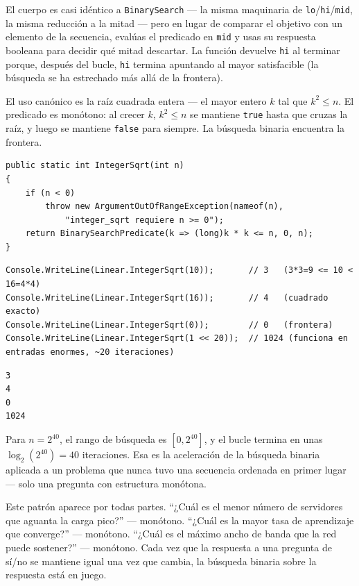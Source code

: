 \documentclass[11pt,a4paper]{article}
\begin{document}
El cuerpo es casi idéntico a \texttt{BinarySearch} --- la misma maquinaria de \texttt{lo}/\texttt{hi}/\texttt{mid}, la misma reducción a la mitad --- pero en lugar de comparar el objetivo con un elemento de la secuencia, evalúas el predicado en \texttt{mid} y usas su respuesta booleana para decidir qué mitad descartar. La función devuelve \texttt{hi} al terminar porque, después del bucle, \texttt{hi} termina apuntando al mayor satisfacible (la búsqueda se ha estrechado más allá de la frontera).

El uso canónico es la raíz cuadrada entera --- el mayor entero $k$ tal que $k^2 \le n$. El predicado es monótono: al crecer $k$, $k^2 \le n$ se mantiene \texttt{true} hasta que cruzas la raíz, y luego se mantiene \texttt{false} para siempre. La búsqueda binaria encuentra la frontera.

\begin{lstlisting}[caption={Raíz cuadrada entera vía búsqueda binaria sobre el predicado}]
public static int IntegerSqrt(int n)
{
    if (n < 0)
        throw new ArgumentOutOfRangeException(nameof(n),
            "integer_sqrt requiere n >= 0");
    return BinarySearchPredicate(k => (long)k * k <= n, 0, n);
}
\end{lstlisting}

\begin{lstlisting}
Console.WriteLine(Linear.IntegerSqrt(10));       // 3   (3*3=9 <= 10 < 16=4*4)
Console.WriteLine(Linear.IntegerSqrt(16));       // 4   (cuadrado exacto)
Console.WriteLine(Linear.IntegerSqrt(0));        // 0   (frontera)
Console.WriteLine(Linear.IntegerSqrt(1 << 20));  // 1024 (funciona en entradas enormes, ~20 iteraciones)
\end{lstlisting}

\begin{verbatim}
3
4
0
1024
\end{verbatim}

Para $n = 2^{40}$, el rango de búsqueda es $[0, 2^{40}]$, y el bucle termina en unas $\log_2(2^{40}) = 40$ iteraciones. Esa es la aceleración de la búsqueda binaria aplicada a un problema que nunca tuvo una secuencia ordenada en primer lugar --- solo una pregunta con estructura monótona.

Este patrón aparece por todas partes. ``¿Cuál es el menor número de servidores que aguanta la carga pico?'' --- monótono. ``¿Cuál es la mayor tasa de aprendizaje que converge?'' --- monótono. ``¿Cuál es el máximo ancho de banda que la red puede sostener?'' --- monótono. Cada vez que la respuesta a una pregunta de sí/no se mantiene igual una vez que cambia, la búsqueda binaria sobre la respuesta está en juego.
\end{document}
